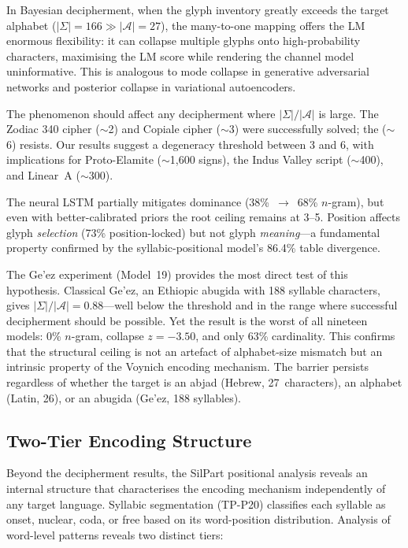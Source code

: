 In Bayesian decipherment, when the glyph inventory greatly exceeds the target alphabet ($|\Sigma| = 166 \gg |\mathcal{A}| = 27$), the many-to-one mapping offers the LM enormous flexibility: it can collapse multiple glyphs onto high-probability characters, maximising the LM score while rendering the channel model uninformative.  This is analogous to mode collapse in generative adversarial networks and posterior collapse in variational autoencoders.

The phenomenon should affect any decipherment where $|\Sigma|/|\mathcal{A}|$ is large.  The Zodiac 340 cipher ($\sim$2) and Copiale cipher ($\sim$3) were successfully solved; the \vms{} ($\sim$6) resists.  Our results suggest a degeneracy threshold between 3 and 6, with implications for Proto-Elamite ($\sim$1,600 signs), the Indus Valley script ($\sim$400), and Linear~A ($\sim$300).

The neural LSTM partially mitigates dominance (38\%~$\to$~68\% $n$-gram), but even with better-calibrated priors the root ceiling remains at 3--5.  Position affects glyph \emph{selection} (73\% position-locked) but not glyph \emph{meaning}---a fundamental property confirmed by the syllabic-positional model's 86.4\% table divergence.

The Ge'ez experiment (Model~19) provides the most direct test of this hypothesis.  Classical Ge'ez, an Ethiopic abugida with 188 syllable characters, gives $|\Sigma|/|\mathcal{A}| = 0.88$---well below the threshold and in the range where successful decipherment should be possible.  Yet the result is the worst of all nineteen models: 0\% $n$-gram, collapse $z = -3.50$, and only 63\% cardinality.  This confirms that the structural ceiling is not an artefact of alphabet-size mismatch but an intrinsic property of the Voynich encoding mechanism.  The barrier persists regardless of whether the target is an abjad (Hebrew, 27~characters), an alphabet (Latin, 26), or an abugida (Ge'ez, 188 syllables).

\subsection{Two-Tier Encoding Structure}

Beyond the decipherment results, the SilPart positional analysis reveals an internal structure that characterises the encoding mechanism independently of any target language.  Syllabic segmentation (TP-P20) classifies each syllable as onset, nuclear, coda, or free based on its word-position distribution.  Analysis of word-level patterns reveals two distinct tiers:

